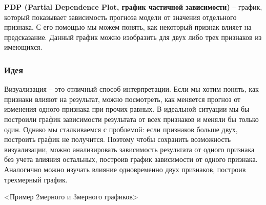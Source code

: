 \textbf{PDP (Partial Dependence Plot, график частичной зависимости)} -- график, который показывает зависимость прогноза модели от значения отдельного признака. С его помощью мы можем понять, как некоторый признак влияет на предсказание. Данный график можно изобразить для двух либо трех признаков из имеющихся.

\subsubsection{Идея}
Визуализация -- это отличный способ интерпретации. Если мы хотим понять, как признаки влияют на результат, можно посмотреть, как меняется прогноз от изменения одного признака при прочих равных. В идеальной ситуации мы бы построили график зависимости результата от всех признаков и меняли бы только один. Однако мы сталкиваемся с проблемой: если признаков больше двух, построить график не получится. Поэтому чтобы сохранить возможность визуализации, можно анализировать зависимость результата от одного признака без учета влияния остальных, построив график зависимости от одного признака. Аналогично можно изучать влияние одновременно двух признаков, построив трехмерный график.

<Пример 2мерного и 3мерного графиков>